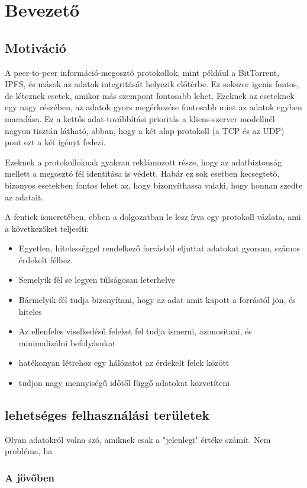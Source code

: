 \chapter{Bevezet\H{o}}\label{ch:BEV}

\section{Motiváció}\label{sec:BEV:mot}

A peer-to-peer információ-megosztó protokollok,
mint például a BitTorrent, IPFS, és mások az
adatok integritását helyezik el\H{o}térbe. Ez
sokszor igenis fontos, de léteznek esetek,
amikor más szempont fontosabb lehet. Ezeknek az
eseteknek egy nagy részében, az adatok gyors
megérkezése fontosabb mint az adatok egyben
maradása. Ez a kett\H{o}s adat-továbbítási
prioritás a kliens-szerver modellnél nagyon
tisztán látható, abban, hogy a két alap
protokoll (a TCP és az UDP) pont ezt a két
igényt fedezi.

Ezeknek a protokolloknak gyakran reklámozott
része, hogy az adatbiztonság mellett a megosztó
fél identitása is védett. Habár ez sok esetben
kecsegtet\H{o}, bizonyos esetekben fontos lehet az,
hogy bizonyíthassa valaki, hogy honnan szedte az
adatait.

A fentiek ismeretében, ebben a dolgozatban le
lesz írva egy protokoll vázlata, ami a
következ\H{o}ket teljesíti:
\begin{itemize}
\item Egyetlen, hitelességgel rendelkez\H{o}
forrásból eljuttat adatokat gyorsan, számos
érdekelt félhez.
\item Semelyik fél se legyen túlságosan
leterhelve
\item Bármelyik fél tudja bizonyítani, hogy az
adat amit kapott a forrástól jön, és hiteles
\item Az ellenfeles viselkedés\H{u} feleket fel
tudja ismerni, azonosítani, és minimalizálni
befolyásukat
\item hatékonyan létrehoz egy hálózatot az
érdekelt felek között
\item tudjon nagy mennyiségű időtől függő adatokat közvetíteni
\end{itemize}


\section{lehetséges felhasználási területek}

Olyan adatokról volna szó, amiknek csak a "jelenlegi" értéke számít. Nem probléma, ha

\subsection{A jövőben}
